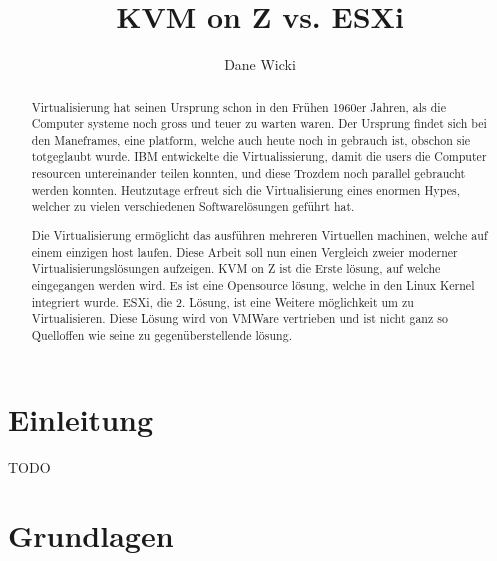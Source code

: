 \documentclass[14pt]{extreport}
\author{Dane Wicki}
\title{KVM on Z vs. ESXi}
\begin{document}
\maketitle

\begin{abstract}
Virtualisierung hat seinen Ursprung schon in den Frühen 1960er Jahren, als die Computer systeme noch gross und teuer zu warten waren. Der Ursprung findet sich bei den Maneframes, eine platform, welche auch heute noch in gebrauch ist, obschon sie totgeglaubt wurde. IBM entwickelte die Virtualissierung, damit die users die Computer resourcen untereinander teilen konnten, und diese Trozdem noch parallel gebraucht werden konnten. Heutzutage erfreut sich die Virtualisierung eines enormen Hypes, welcher zu vielen verschiedenen Softwarelösungen geführt hat.

Die Virtualisierung ermöglicht das ausführen mehreren Virtuellen machinen, welche auf einem einzigen host laufen. Diese Arbeit soll nun einen Vergleich zweier moderner Virtualisierungslösungen aufzeigen. KVM on Z ist die Erste lösung, auf welche eingegangen werden wird. Es ist eine Opensource lösung, welche in den Linux Kernel integriert wurde. 
ESXi, die 2. Lösung, ist eine Weitere möglichkeit um zu Virtualisieren. Diese Lösung wird von VMWare vertrieben und ist nicht ganz so Quelloffen wie seine zu gegenüberstellende lösung.

\end{abstract}

\tableofcontents

\chapter{Einleitung}
TODO
\chapter{Grundlagen}
\end{document}
